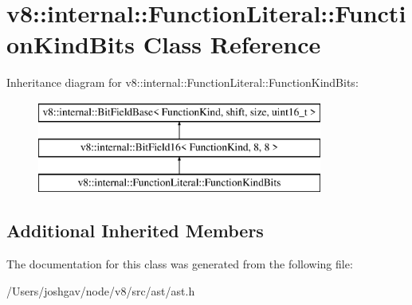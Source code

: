 \hypertarget{classv8_1_1internal_1_1_function_literal_1_1_function_kind_bits}{}\section{v8\+:\+:internal\+:\+:Function\+Literal\+:\+:Function\+Kind\+Bits Class Reference}
\label{classv8_1_1internal_1_1_function_literal_1_1_function_kind_bits}
Inheritance diagram for v8\+:\+:internal\+:\+:Function\+Literal\+:\+:Function\+Kind\+Bits\+:\begin{figure}[H]
\begin{center}
\leavevmode
\includegraphics[height=3.000000cm]{classv8_1_1internal_1_1_function_literal_1_1_function_kind_bits}
\end{center}
\end{figure}
\subsection*{Additional Inherited Members}


The documentation for this class was generated from the following file\+:\begin{DoxyCompactItemize}
\item 
/\+Users/joshgav/node/v8/src/ast/ast.\+h\end{DoxyCompactItemize}
